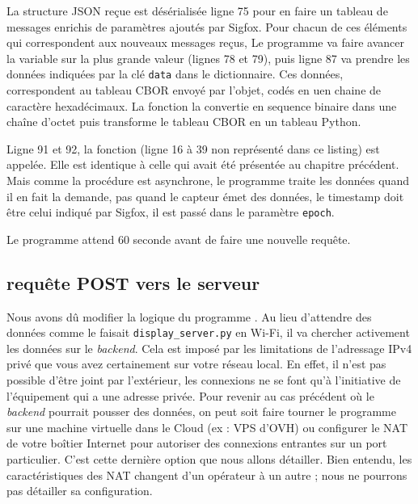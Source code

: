 
La structure JSON reçue est désérialisée ligne 75 pour en faire un tableau de messages enrichis de paramètres ajoutés par Sigfox. Pour chacun de ces éléments qui correspondent aux nouveaux messages reçus, Le programme va faire avancer la variable  sur la plus grande valeur (lignes 78 et 79), puis ligne 87 va prendre les données indiquées par la clé \texttt{data} dans le dictionnaire. Ces données, correspondent au tableau CBOR envoyé par l'objet, codés en uen chaine de caractère hexadécimaux. La fonction  la convertie en sequence binaire dans une chaîne d'octet puis  transforme le tableau CBOR en un tableau Python.

Ligne 91 et 92, la fonction \texttt{} (ligne 16 à 39 non représenté dans ce listing) est appelée. Elle est identique à celle qui avait été présentée au chapitre précédent. Mais comme la procédure est asynchrone, le programme traite les données quand il en fait la demande, pas quand le capteur émet des données, le timestamp doit être celui indiqué par Sigfox, il est passé dans le paramètre \texttt{epoch}.


Le programme attend 60 seconde avant de faire une nouvelle requête.


\subsection{requête POST vers le serveur}

\begin{figure}
\end{figure}

Nous avons dû modifier la logique du programme . Au lieu d’attendre des données comme le faisait \texttt{display\_server.py} en Wi-Fi, il va chercher activement les données sur le \textit{backend}. Cela est imposé par les limitations de l’adressage IPv4 privé que vous avez certainement sur votre réseau local. En effet, il n’est pas possible d’être joint par l’extérieur, les connexions ne se font qu'à l’initiative de l’équipement qui a une adresse privée. Pour revenir au cas précédent où le \textit{backend} pourrait pousser des données, on peut soit faire tourner le programme sur une machine virtuelle dans le Cloud (ex : \ac{VPS} d’\acs{OVH}) ou configurer le \ac{NAT} de votre boîtier Internet pour autoriser des connexions entrantes sur un port particulier. C’est cette dernière option que nous allons détailler. Bien entendu, les caractéristiques des \ac{NAT} changent d’un opérateur à un autre ; nous ne pourrons pas détailler sa configuration.

